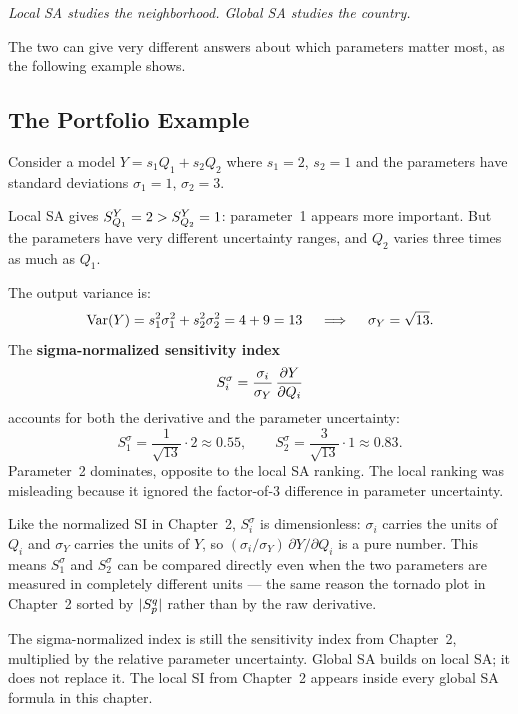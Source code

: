 \begin{flushright}
\textit{\small Local SA studies the neighborhood. Global SA studies the country.}
\end{flushright}

The two can give very different answers about which parameters matter most,
as the following example shows.

\subsection{The Portfolio Example}

Consider a model $Y = s_1 Q_1 + s_2 Q_2$ where $s_1 = 2$, $s_2 = 1$
and the parameters have standard deviations $\sigma_1 = 1$, $\sigma_2 = 3$.

Local SA gives $S_{Q_1}^{Y} = 2 > S_{Q_2}^{Y} = 1$:
parameter~1 appears more important. But the parameters have very different
uncertainty ranges, and $Q_2$ varies three times as much as $Q_1$.

The output variance is:
\[
  \operatorname{Var}(Y) = s_1^2\sigma_1^2 + s_2^2\sigma_2^2 = 4 + 9 = 13
  \quad\implies\quad \sigma_Y = \sqrt{13}.
\]
The \textbf{sigma-normalized sensitivity index}
\begin{equation}
  S_i^\sigma = \frac{\sigma_i}{\sigma_Y}\,\frac{\partial Y}{\partial Q_i}
  \label{eq:sigmanorm}
\end{equation}
accounts for both the derivative and the parameter uncertainty:
\[
  S_1^\sigma = \frac{1}{\sqrt{13}}\cdot 2 \approx 0.55, \qquad
  S_2^\sigma = \frac{3}{\sqrt{13}}\cdot 1 \approx 0.83.
\]
Parameter~2 dominates, opposite to the local SA ranking.
The local ranking was misleading because it ignored the factor-of-3
difference in parameter uncertainty.

Like the normalized SI in Chapter~2, $S_i^\sigma$ is dimensionless:
$\sigma_i$ carries the units of $Q_i$ and $\sigma_Y$ carries the units
of $Y$, so $(\sigma_i/\sigma_Y)\,\partial Y/\partial Q_i$ is a pure
number.
This means $S_1^\sigma$ and $S_2^\sigma$ can be compared directly even
when the two parameters are measured in completely different units ---
the same reason the tornado plot in Chapter~2 sorted by
$|S_{p}^{q}|$ rather than by the raw derivative.

 The sigma-normalized index is still the sensitivity
index from Chapter~2, multiplied by the relative parameter uncertainty.
Global SA builds on local SA; it does not replace it. The local SI
from Chapter~2 appears inside every global SA formula in this chapter.


